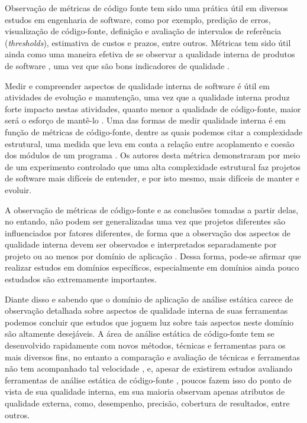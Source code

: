 
Observação de métricas de código fonte tem sido uma prática útil em diversos
estudos em engenharia de software, como por exemplo, predição de erros,
visualização de código-fonte, definição e avaliação de intervalos de referência
({\it thresholds}), estimativa de custos e prazos, entre outros.  Métricas tem
sido útil ainda como uma maneira efetiva de se observar a qualidade interna de
produtos de software \cite{Meirelles2013}, uma vez que são bons indicadores de
qualidade \cite{Basili1996}.

Medir e compreender aspectos de qualidade interna de software é útil em
atividades de evolução e manutenção, uma vez que a qualidade interna produz
forte impacto nestas atividades, quanto menor a qualidade de código-fonte,
maior será o esforço de mantê-lo \cite{Terceiro2010}. Uma das formas de medir
qualidade interna é em função de métricas de código-fonte, dentre as quais
podemos citar a complexidade estrutural, uma medida que leva em conta a relação
entre acoplamento e coesão dos módulos de um programa \cite{Darcy2005}. Os
autores desta métrica demonstraram por meio de um experimento controlado que
uma alta complexidade estrutural faz projetos de software mais difíceis de
entender, e por isto mesmo, mais difíceis de manter e evoluir.

A observação de métricas de código-fonte e as conclusões tomadas a partir
delas, no entando, não podem ser generalizadas uma vez que projetos diferentes
são influenciados por fatores diferentes, de forma que a observação dos
aspectos de qualidade interna devem ser observados e interpretados
separadamente por projeto \cite{Terceiro2012Understanding} ou ao menos por
domínio de aplicação \cite{Meirelles2013}. Dessa forma, pode-se afirmar que
realizar estudos em domínios específicos, especialmente em domínios ainda pouco
estudados são extremamente importantes.

Diante disso e sabendo que o domínio de aplicação de análise estática carece de
observação detalhada sobre aspectos de qualidade interna de suas ferramentas
podemos concluir que estudos que joguem luz sobre tais aspectos neste domínio
são altamente desejáveis. A área de análise estática de código-fonte tem se
desenvolvido rapidamente com novos métodos, técnicas e ferramentas para os mais
diversos fins, no entanto a comparação e avaliação de técnicas e ferramentas
não tem acompanhado tal velocidade \cite{Li2010}, e, apesar de existirem
estudos avaliando ferramentas de análise estática de código-fonte
\cite{Rutar2004, Kratkiewicz2005, Okun2007, Emanuelsson2008, Wedyan2009,
Mantere2009, Al2010, Li2010, Johns2011, Alemerien2013, Ataide2014}, poucos
fazem isso do ponto de vista de sua qualidade interna, em sua maioria observam
apenas atributos de qualidade externa, como, desempenho, precisão, cobertura de
resultados, entre outros.

